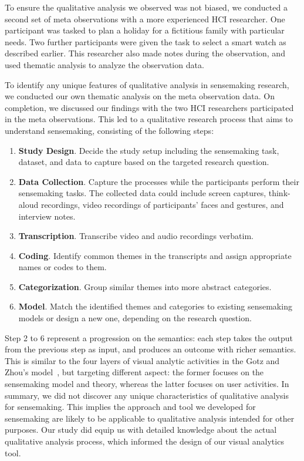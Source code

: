 To ensure the qualitative analysis we observed was not biased, we conducted a second set of meta observations with a more experienced HCI researcher. One participant was tasked to plan a holiday for a fictitious family with particular needs. Two further participants were given the task to select a smart watch as described earlier. This researcher also made notes during the observation, and used thematic analysis to analyze the observation data.

To identify any unique features of qualitative analysis in sensemaking research, we conducted our own thematic analysis on the meta observation data. On completion, we discussed our findings with the two HCI researchers participated in the meta observations. This led to a qualitative research process that aims to understand sensemaking, consisting of the following steps:

\begin{enumerate}
	\item \textbf{Study Design}. Decide the study setup including the sensemaking task, dataset, and data to capture based on the targeted research question.
	\item \textbf{Data Collection}. Capture the processes while the participants perform their sensemaking tasks. The collected data could include screen captures, think-aloud recordings, video recordings of participants' faces and gestures, and interview notes.
	\item \textbf{Transcription}. Transcribe video and audio recordings verbatim.
	\item \textbf{Coding}. Identify common themes in the transcripts and assign appropriate names or codes to them.
	\item \textbf{Categorization}. Group similar themes into more abstract categories.
	\item \textbf{Model}. Match the identified themes and categories to existing sensemaking models or design a new one, depending on the research question.
\end{enumerate}

Step 2 to 6 represent a progression on the semantics: each step takes the output from the previous step as input, and produces an outcome with richer semantics. This is similar to the four layers of visual analytic activities in the Gotz and Zhou's model~\cite{Gotz2009}, but targeting different aspect: the former focuses on the sensemaking model and theory, whereas the latter focuses on user activities. In summary, we did not discover any unique characteristics of qualitative analysis for sensemaking. This implies the approach and tool we developed for sensemaking are likely to be applicable to qualitative analysis intended for other purposes. Our study did equip us with detailed knowledge about the actual qualitative analysis process, which informed the design of our visual analytics tool.

